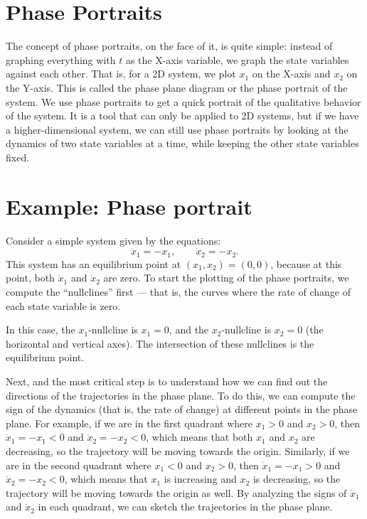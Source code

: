 \documentclass{ee122_notes}
\begin{document}
\section{Phase Portraits}
The concept of phase portraits, on the face of it, is quite simple: instead of graphing everything with $t$ as the X-axis variable, we graph the state variables against each other. That is, for a 2D system, we plot $x_1$ on the X-axis and $x_2$ on the Y-axis. This is called the phase plane diagram or the phase portrait of the system. We use phase portraits to get a quick portrait of the qualitative behavior of the system. It is a tool that can only be applied to 2D systems, but if we have a higher-dimensional system, we can still use phase portraits by looking at the dynamics of two state variables at a time, while keeping the other state variables fixed.

\section{Example: Phase portrait}
Consider a simple system given by the equations:
\[
\dot x_1 = -x_1, \qquad \dot x_2 = -x_2.
\]
This system has an equilibrium point at $(x_1, x_2) = (0,0)$, because at this point, both $\dot x_1$ and $\dot x_2$ are zero. To start the plotting of the phase portraits, we compute the ``nullclines'' first --- that is, the curves where the rate of change of each state variable is zero. 

In this case, the $x_1$-nullcline is $x_1 = 0$, and the $x_2$-nullcline is $x_2 = 0$ (the horizontal and vertical axes). The intersection of these nullclines is the equilibrium point. 

Next, and the most critical step is to understand how we can find out the directions of the trajectories in the phase plane. To do this, we can compute the sign of the dynamics (that is, the rate of change) at different points in the phase plane. For example, if we are in the first quadrant where $x_1 > 0$ and $x_2 > 0$, then $\dot x_1 = -x_1 < 0$ and $\dot x_2 = -x_2 < 0$, which means that both $x_1$ and $x_2$ are decreasing, so the trajectory will be moving towards the origin. Similarly, if we are in the second quadrant where $x_1 < 0$ and $x_2 > 0$, then $\dot x_1 = -x_1 > 0$ and $\dot x_2 = -x_2 < 0$, which means that $x_1$ is increasing and $x_2$ is decreasing, so the trajectory will be moving towards the origin as well. By analyzing the signs of $\dot x_1$ and $\dot x_2$ in each quadrant, we can sketch the trajectories in the phase plane.
\end{document}
